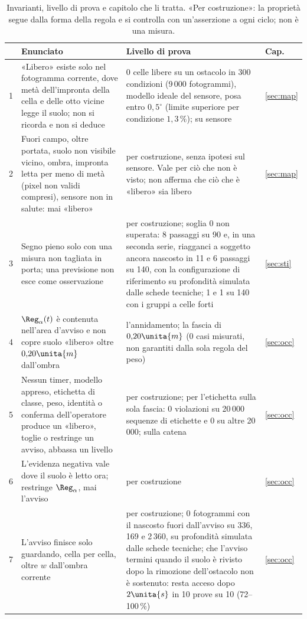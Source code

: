 \begin{table}[H]\centering\footnotesize
\caption{Invarianti, livello di prova e capitolo che li tratta. «Per costruzione»: la proprietà segue dalla forma della regola e si controlla con un'asserzione a ogni ciclo; non è una misura.}\label{tab:lim-invarianti}
\begin{tabularx}{\linewidth}{@{}rLLp{1.1cm}@{}}
\toprule
 & Enunciato & Livello di prova & Cap.\\
 & «Libero» esiste solo nel fotogramma corrente, dove metà dell'impronta della cella e delle otto vicine legge il suolo; non si ricorda e non si deduce &  0 celle libere su un ostacolo in 300 condizioni (9\,000 fotogrammi), modello ideale del sensore, posa entro $0{,}5^\circ$ (limite superiore per condizione $1{,}3\,\%$);  su sensore & \ref{sec:map}\\
2 & Fuori campo, oltre portata, suolo non visibile vicino, ombra, impronta letta per meno di metà (pixel non validi compresi), sensore non in salute: mai «libero» &  per costruzione, senza ipotesi sul sensore. Vale per ciò che non è visto; non afferma che ciò che è «libero» sia libero & \ref{sec:map}\\
3 & Segno pieno solo con una misura non tagliata in porta; una previsione non esce come osservazione & per costruzione; soglia 0 non superata: 8 passaggi su 90 e, in una seconda serie, riagganci a soggetto ancora nascosto in 11 e 6 passaggi su 140, con la configurazione di riferimento su profondità simulata dalle schede tecniche; 1 e 1 su 140 con i gruppi a celle forti  & \ref{sec:sti}\\
4 & $\Reg_\alpha(t)$ è contenuta nell'area d'avviso e non copre suolo «libero» oltre $0{,}20\unita{m}$ dall'ombra &  l'annidamento;  la fascia di $0{,}20\unita{m}$ (0 casi misurati, non garantiti dalla sola regola del peso) & \ref{sec:occ}\\
5 & Nessun timer, modello appreso, etichetta di classe, peso, identità o conferma dell'operatore produce un «libero», toglie o restringe un avviso, abbassa un livello & per costruzione; per l'etichetta  sulla sola fascia: 0 violazioni su 20\,000 sequenze di etichette e 0 su altre 20\,000;  sulla catena & \ref{sec:occ}\\
6 & L'evidenza negativa vale dove il suolo è letto ora; restringe $\Reg_\alpha$, mai l'avviso & per costruzione & \ref{sec:occ}\\
7 & L'avviso finisce solo guardando, cella per cella, oltre $w$ dall'ombra corrente & per costruzione;  0 fotogrammi con il nascosto fuori dall'avviso su 336, 169 e 2\,360, su profondità simulata dalle schede tecniche; che l'avviso termini quando il suolo è rivisto dopo la rimozione dell'ostacolo non è sostenuto: resta acceso dopo $2\unita{s}$ in 10 prove su 10 (72--100\,\%) & \ref{sec:occ}\\

\end{tabularx}
\end{table}
